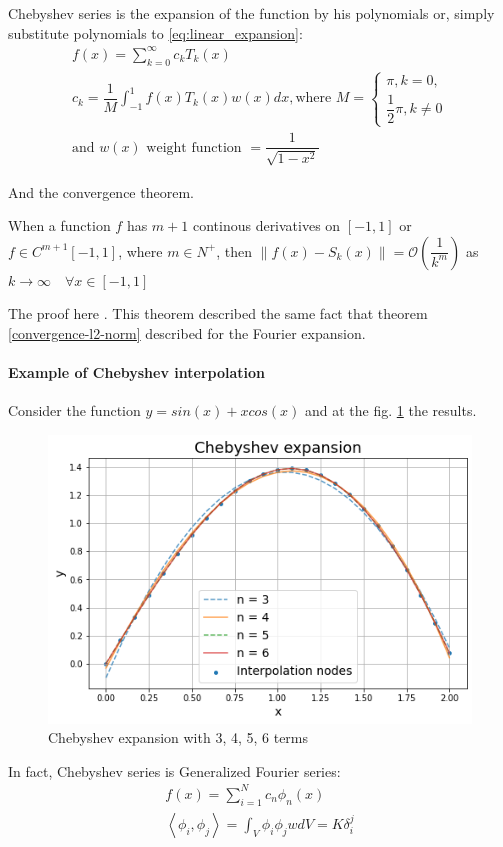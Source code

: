 Chebyshev series is the expansion of the function by his polynomials or, simply substitute polynomials to \eqref{eq:linear_expansion}:
\begin{equation*}
	\begin{multlined}
		f(x) = \sum_{k = 0}^{\infty} c_k T_k(x) \\
		c_k = \dfrac{1}{M} \int_{-1}^1 f(x) T_k(x) w(x) dx, \text{where } M = \begin{cases}
		\pi, k = 0, \\
		\dfrac{1}{2} \pi, k \neq 0
	\end{cases} \\
	\text{and } w(x) \text{ weight function } = \dfrac{1}{\sqrt{1 - x^2}}
	\end{multlined}
\end{equation*}

And the convergence theorem.
\begin{theorem}
\label{chevyshev_convergence}
When a function $f$ has $m + 1$ continous derivatives on $[-1, 1]$ or $ f \in C^{m + 1}[-1, 1] $, where $m \in N^+$, then $\| f(x) - S_k(x) \| = \mathcal{O}\left ( \dfrac{1}{k^m} \right )$ as $k \rightarrow \infty \quad \forall x \in [-1, 1]$ 
\end{theorem}
The proof here \cite{mason2002chebyshev}.
This theorem described the same fact that theorem \ref{convergence-l2-norm}  described for the Fourier expansion.

\paragraph{Example of Chebyshev interpolation}
Consider the function $y = sin(x) + x cos(x)$ and at the fig. \ref{fig:chebyshev_expansion} the results. 
\begin{figure}[h]
	\centering
	\includegraphics[width=0.7 \textwidth]{images/chapter2/chebyshev_series.png}
	\caption{Chebyshev expansion with 3, 4, 5, 6 terms }
	\label{fig:chebyshev_expansion}
\end{figure}


In fact, Chebyshev series is Generalized Fourier series: 
\begin{equation*}
	\begin{multlined}
		f(x) = \sum_{i = 1}^{N} c_n \phi_n(x) \\
		\left < \phi_i, \phi_j \right > = \int_{V} \phi_i \phi_j w dV = K \delta_i^j
	\end{multlined}
\end{equation*}
